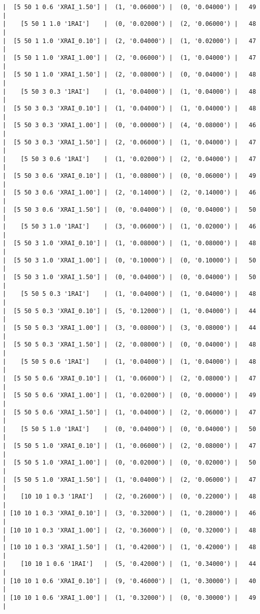 \documentclass{article}
\begin{document}
\begin{verbatim}
|  [5 50 1 0.6 'XRAI_1.50'] |  (1, '0.06000') |  (0, '0.04000') |   49  |
|    [5 50 1 1.0 '1RAI']    |  (0, '0.02000') |  (2, '0.06000') |   48  |
|  [5 50 1 1.0 'XRAI_0.10'] |  (2, '0.04000') |  (1, '0.02000') |   47  |
|  [5 50 1 1.0 'XRAI_1.00'] |  (2, '0.06000') |  (1, '0.04000') |   47  |
|  [5 50 1 1.0 'XRAI_1.50'] |  (2, '0.08000') |  (0, '0.04000') |   48  |
|    [5 50 3 0.3 '1RAI']    |  (1, '0.04000') |  (1, '0.04000') |   48  |
|  [5 50 3 0.3 'XRAI_0.10'] |  (1, '0.04000') |  (1, '0.04000') |   48  |
|  [5 50 3 0.3 'XRAI_1.00'] |  (0, '0.00000') |  (4, '0.08000') |   46  |
|  [5 50 3 0.3 'XRAI_1.50'] |  (2, '0.06000') |  (1, '0.04000') |   47  |
|    [5 50 3 0.6 '1RAI']    |  (1, '0.02000') |  (2, '0.04000') |   47  |
|  [5 50 3 0.6 'XRAI_0.10'] |  (1, '0.08000') |  (0, '0.06000') |   49  |
|  [5 50 3 0.6 'XRAI_1.00'] |  (2, '0.14000') |  (2, '0.14000') |   46  |
|  [5 50 3 0.6 'XRAI_1.50'] |  (0, '0.04000') |  (0, '0.04000') |   50  |
|    [5 50 3 1.0 '1RAI']    |  (3, '0.06000') |  (1, '0.02000') |   46  |
|  [5 50 3 1.0 'XRAI_0.10'] |  (1, '0.08000') |  (1, '0.08000') |   48  |
|  [5 50 3 1.0 'XRAI_1.00'] |  (0, '0.10000') |  (0, '0.10000') |   50  |
|  [5 50 3 1.0 'XRAI_1.50'] |  (0, '0.04000') |  (0, '0.04000') |   50  |
|    [5 50 5 0.3 '1RAI']    |  (1, '0.04000') |  (1, '0.04000') |   48  |
|  [5 50 5 0.3 'XRAI_0.10'] |  (5, '0.12000') |  (1, '0.04000') |   44  |
|  [5 50 5 0.3 'XRAI_1.00'] |  (3, '0.08000') |  (3, '0.08000') |   44  |
|  [5 50 5 0.3 'XRAI_1.50'] |  (2, '0.08000') |  (0, '0.04000') |   48  |
|    [5 50 5 0.6 '1RAI']    |  (1, '0.04000') |  (1, '0.04000') |   48  |
|  [5 50 5 0.6 'XRAI_0.10'] |  (1, '0.06000') |  (2, '0.08000') |   47  |
|  [5 50 5 0.6 'XRAI_1.00'] |  (1, '0.02000') |  (0, '0.00000') |   49  |
|  [5 50 5 0.6 'XRAI_1.50'] |  (1, '0.04000') |  (2, '0.06000') |   47  |
|    [5 50 5 1.0 '1RAI']    |  (0, '0.04000') |  (0, '0.04000') |   50  |
|  [5 50 5 1.0 'XRAI_0.10'] |  (1, '0.06000') |  (2, '0.08000') |   47  |
|  [5 50 5 1.0 'XRAI_1.00'] |  (0, '0.02000') |  (0, '0.02000') |   50  |
|  [5 50 5 1.0 'XRAI_1.50'] |  (1, '0.04000') |  (2, '0.06000') |   47  |
|    [10 10 1 0.3 '1RAI']   |  (2, '0.26000') |  (0, '0.22000') |   48  |
| [10 10 1 0.3 'XRAI_0.10'] |  (3, '0.32000') |  (1, '0.28000') |   46  |
| [10 10 1 0.3 'XRAI_1.00'] |  (2, '0.36000') |  (0, '0.32000') |   48  |
| [10 10 1 0.3 'XRAI_1.50'] |  (1, '0.42000') |  (1, '0.42000') |   48  |
|    [10 10 1 0.6 '1RAI']   |  (5, '0.42000') |  (1, '0.34000') |   44  |
| [10 10 1 0.6 'XRAI_0.10'] |  (9, '0.46000') |  (1, '0.30000') |   40  |
| [10 10 1 0.6 'XRAI_1.00'] |  (1, '0.32000') |  (0, '0.30000') |   49  |

\end{verbatim}
\end{document}
